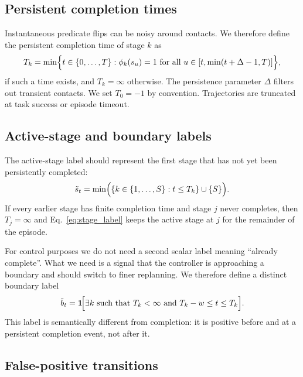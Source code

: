 \documentclass[10pt]{article}
\newcommand{\Sstages}{S}
\newcommand{\bt}{\tilde{b}_t}
\newcommand{\st}{\tilde{s}_t}
\newcommand{\one}{\mathbf{1}}
\begin{document}
\subsection{Persistent completion times}

Instantaneous predicate flips can be noisy around contacts.
We therefore define the persistent completion time of stage $k$ as
\begin{equation}
  T_k = \min\Bigl\{ t \in \{0,\dots,T\} :
  \phi_k(s_u)=1\ \text{for all }u \in [t,\min(t+\Delta-1,T)] \Bigr\},
  \label{eq:Tk}
\end{equation}
if such a time exists, and $T_k=\infty$ otherwise.
The persistence parameter $\Delta$ filters out transient contacts.
We set $T_0=-1$ by convention.
Trajectories are truncated at task success or episode timeout.

\subsection{Active-stage and boundary labels}

The active-stage label should represent the first stage that has not yet been
persistently completed:
\begin{equation}
  \st = \min\Bigl(\{k \in \{1,\dots,\Sstages\} : t \le T_k\} \cup \{\Sstages\}\Bigr).
  \label{eq:stage_label}
\end{equation}
If every earlier stage has finite completion time and stage $j$ never completes,
then $T_j=\infty$ and Eq.~\eqref{eq:stage_label} keeps the active stage at $j$
for the remainder of the episode.

For control purposes we do not need a second scalar label meaning ``already
complete''.
What we need is a signal that the controller is approaching a boundary and
should switch to finer replanning.
We therefore define a distinct boundary label
\begin{equation}
  \bt = \one\!\Bigl[\exists k \text{ such that } T_k<\infty
  \text{ and } T_k-w \le t \le T_k \Bigr].
  \label{eq:boundary_label}
\end{equation}
This label is semantically different from completion: it is positive before and
at a persistent completion event, not after it.

\subsection{False-positive transitions}
\end{document}
